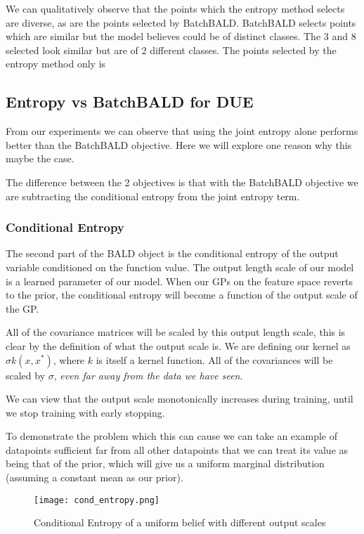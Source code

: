 \documentclass[12pt, a4paper]{report}
\theoremstyle{definition}
\theoremstyle{definition}
\theoremstyle{definition}
\begin{document}
We can qualitatively observe that the points which the entropy method selects are diverse, as are the points selected by BatchBALD. BatchBALD selects points which are similar but the model believes could be of distinct classes. The 3 and 8 selected look similar but are of 2 different classes. The points selected by the entropy method only is 


\subsection{Entropy vs BatchBALD for DUE}


From our experiments we can observe that using the joint entropy alone performs better than the BatchBALD objective. Here we will explore one reason why this maybe the case.

The difference between the 2 objectives is that with the BatchBALD objective we are subtracting the conditional entropy from the joint entropy term.

\subsubsection{Conditional Entropy}

The second part of the BALD object is the conditional entropy of the output variable conditioned on the function value. The output length scale of our model is a learned parameter of our model. When our GPs on the feature space reverts to the prior, the conditional entropy will become a function of the output scale of the GP.

All of the covariance matrices will be scaled by this output length scale, this is clear by the definition of what the output scale is. We are defining our kernel as $\sigma k \left(x, x^* \right)$, where $k$ is itself a kernel function. All of the covariances will be scaled by $\sigma$, \textit{even far away from the data we have seen}.

We can view that the output scale monotonically increases during training, until we stop training with early stopping.

To demonstrate the problem which this can cause we can take an example of datapoints sufficient far from all other datapoints that we can treat its value as being that of the prior, which will give us a uniform marginal distribution (assuming a constant mean as our prior).


\begin{figure}[H]
    \centering
        \texttt{[image: cond\_entropy.png]}
        \caption{Conditional Entropy of a uniform belief with different output scales }

\end{figure}
\end{document}

